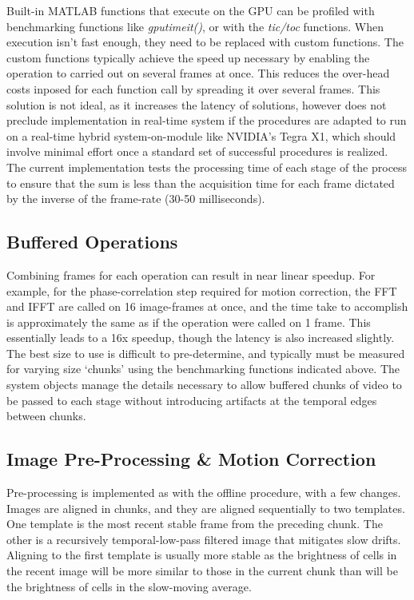 \documentclass[
  12pt,
]{report}
\numberwithin{figure}{section}
\numberwithin{table}{section}
\numberwithin{equations}{section}
\begin{document}
Built-in MATLAB functions that execute on the GPU can be profiled with
benchmarking functions like \emph{gputimeit()}, or with the
\emph{tic/toc} functions. When execution isn't fast enough, they need to
be replaced with custom functions. The custom functions typically
achieve the speed up necessary by enabling the operation to carried out
on several frames at once. This reduces the over-head costs inposed for
each function call by spreading it over several frames. This solution is
not ideal, as it increases the latency of solutions, however does not
preclude implementation in real-time system if the procedures are
adapted to run on a real-time hybrid system-on-module like NVIDIA's
Tegra X1, which should involve minimal effort once a standard set of
successful procedures is realized. The current implementation tests the
processing time of each stage of the process to ensure that the sum is
less than the acquisition time for each frame dictated by the inverse of
the frame-rate (30-50 milliseconds).

\hypertarget{buffered-operations}{%
\subsection{Buffered Operations}\label{buffered-operations}}

Combining frames for each operation can result in near linear speedup.
For example, for the phase-correlation step required for motion
correction, the FFT and IFFT are called on 16 image-frames at once, and
the time take to accomplish is approximately the same as if the
operation were called on 1 frame. This essentially leads to a 16x
speedup, though the latency is also increased slightly. The best size to
use is difficult to pre-determine, and typically must be measured for
varying size `chunks' using the benchmarking functions indicated above.
The system objects manage the details necessary to allow buffered chunks
of video to be passed to each stage without introducing artifacts at the
temporal edges between chunks.

\hypertarget{image-pre-processing-motion-correction}{%
\subsection{Image Pre-Processing \& Motion
Correction}\label{image-pre-processing-motion-correction}}

Pre-processing is implemented as with the offline procedure, with a few
changes. Images are aligned in chunks, and they are aligned sequentially
to two templates. One template is the most recent stable frame from the
preceding chunk. The other is a recursively temporal-low-pass filtered
image that mitigates slow drifts. Aligning to the first template is
usually more stable as the brightness of cells in the recent image will
be more similar to those in the current chunk than will be the
brightness of cells in the slow-moving average.
\end{document}
